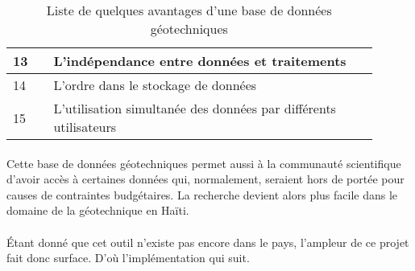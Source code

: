 \begin{table}
\begin{tabular}{|p{0.10\linewidth}|p{0.80\linewidth}|}
                    \\
                \hline 
                    13 &
                    L'indépendance entre données et traitements
                    \\
                \hline 
                    14 &
                    L'ordre dans le stockage de données
                    \\
                \hline 
                    15 &
                    L'utilisation simultanée des données par différents utilisateurs
                    \\
            \hline 
        \end{tabular}
        \caption{Liste de quelques avantages d'une base de données géotechniques} \label{tab:avantages}
\end{table}
\par

\paragraph{}
Cette base de données géotechniques permet aussi à la communauté
scientifique d'avoir accès à certaines données qui, normalement, seraient 
hors de portée pour causes de contraintes budgétaires. La recherche devient alors plus 
facile dans le domaine de la géotechnique en Haïti.


\paragraph{}
Étant donné que cet outil n'existe pas encore
dans le pays, l'ampleur de ce projet fait donc surface.
D'où l'implémentation qui suit.


